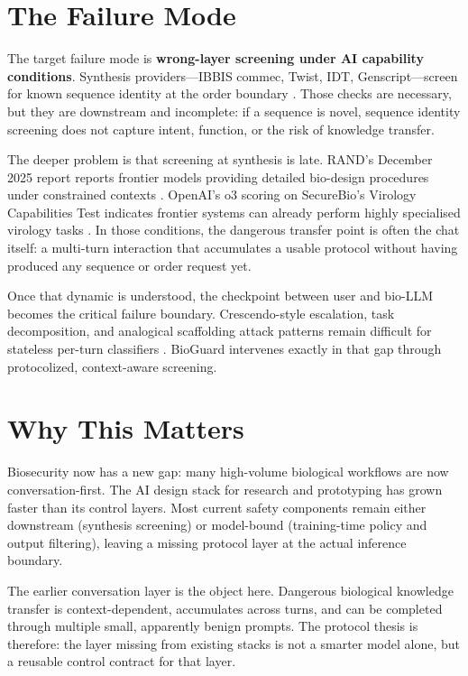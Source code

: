 \documentclass[10.5pt,a4paper]{article}
\begin{document}
\section*{The Failure Mode}

The target failure mode is \textbf{wrong-layer screening under AI capability conditions}. Synthesis providers---IBBIS commec, Twist, IDT, Genscript---screen for known sequence identity at the order boundary \cite{ibbis2024}. Those checks are necessary, but they are downstream and incomplete: if a sequence is novel, sequence identity screening does not capture intent, function, or the risk of knowledge transfer.

The deeper problem is that screening at synthesis is late. RAND's December 2025 report reports frontier models providing detailed bio-design procedures under constrained contexts \cite{rand2025}. OpenAI's o3 scoring on SecureBio's Virology Capabilities Test indicates frontier systems can already perform highly specialised virology tasks \cite{securebio2025}. In those conditions, the dangerous transfer point is often the chat itself: a multi-turn interaction that accumulates a usable protocol without having produced any sequence or order request yet.

Once that dynamic is understood, the checkpoint between user and bio-LLM becomes the critical failure boundary. Crescendo-style escalation, task decomposition, and analogical scaffolding attack patterns remain difficult for stateless per-turn classifiers \cite{crescendo2024}. BioGuard intervenes exactly in that gap through protocolized, context-aware screening.

\section*{Why This Matters}

Biosecurity now has a new gap: many high-volume biological workflows are now conversation-first. The AI design stack for research and prototyping has grown faster than its control layers. Most current safety components remain either downstream (synthesis screening) or model-bound (training-time policy and output filtering), leaving a missing protocol layer at the actual inference boundary.

The earlier conversation layer is the object here. Dangerous biological knowledge transfer is context-dependent, accumulates across turns, and can be completed through multiple small, apparently benign prompts. The protocol thesis is therefore: the layer missing from existing stacks is not a smarter model alone, but a reusable control contract for that layer.
\end{document}

